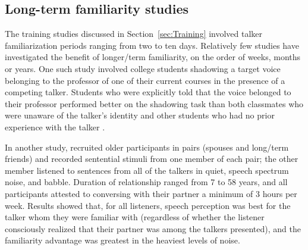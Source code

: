 \subsection{Long-term familiarity studies\label{sec:LongTerm}}
The training studies discussed in Section~\ref{sec:Training} involved talker familiarization periods ranging from two to ten days.  Relatively few studies have investigated the benefit of longer\-/term familiarity, on the order of weeks, months or years.  One such study involved college students shadowing a target voice belonging to the professor of one of their current courses in the presence of a competing talker.  Students who were explicitly told that the voice belonged to their professor performed better on the shadowing task than both classmates who were unaware of the talker’s identity and other students who had no prior experience with the talker \citep{NewmanEvers2007}.  

In another study, \citet{SouzaEtAl2013} recruited older participants in pairs (spouses and long\-/term friends) and recorded sentential stimuli from one member of each pair; the other member listened to sentences from all of the talkers in quiet, speech spectrum noise, and babble.  Duration of relationship ranged from 7 to 58 years, and all participants attested to conversing with their partner a minimum of 3 hours per week.  Results showed that, for all listeners, speech perception was best for the talker whom they were familiar with (regardless of whether the listener consciously realized that their partner was among the talkers presented), and the familiarity advantage was greatest in the heaviest levels of noise.




